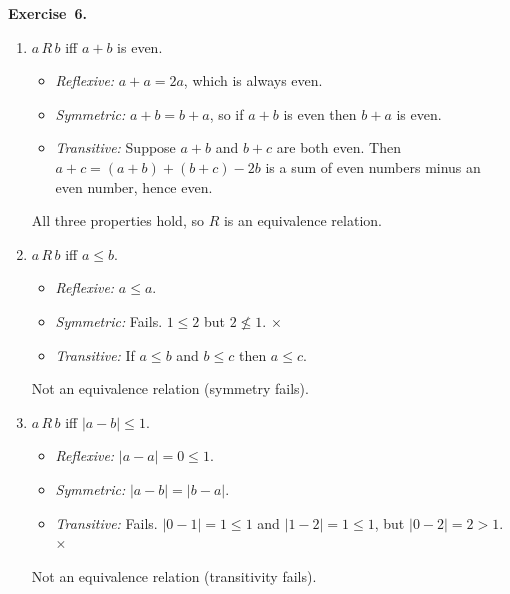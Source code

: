 \documentclass[11pt]{article}
\begin{document}
\textbf{Exercise~6.}
\begin{enumerate}[label=(\alph*)]
  \item $a\,R\,b$ iff $a + b$ is even.
    \begin{itemize}
      \item \emph{Reflexive:} $a + a = 2a$, which is always even. \checkmark
      \item \emph{Symmetric:} $a + b = b + a$, so if $a + b$ is even then
            $b + a$ is even. \checkmark
      \item \emph{Transitive:} Suppose $a + b$ and $b + c$ are both even.
            Then $a + c = (a + b) + (b + c) - 2b$ is a sum of even numbers
            minus an even number, hence even. \checkmark
    \end{itemize}
    All three properties hold, so $R$ is an equivalence relation.

  \item $a\,R\,b$ iff $a \leq b$.
    \begin{itemize}
      \item \emph{Reflexive:} $a \leq a$. \checkmark
      \item \emph{Symmetric:} Fails. $1 \leq 2$ but $2 \not\leq 1$. $\times$
      \item \emph{Transitive:} If $a \leq b$ and $b \leq c$ then
            $a \leq c$. \checkmark
    \end{itemize}
    Not an equivalence relation (symmetry fails).

  \item $a\,R\,b$ iff $|a - b| \leq 1$.
    \begin{itemize}
      \item \emph{Reflexive:} $|a - a| = 0 \leq 1$. \checkmark
      \item \emph{Symmetric:} $|a - b| = |b - a|$. \checkmark
      \item \emph{Transitive:} Fails. $|0 - 1| = 1 \leq 1$ and
            $|1 - 2| = 1 \leq 1$, but $|0 - 2| = 2 > 1$. $\times$
    \end{itemize}
    Not an equivalence relation (transitivity fails).
\end{enumerate}
\end{document}
